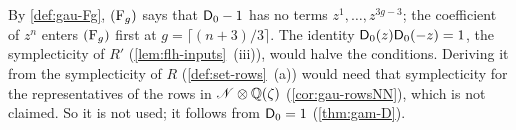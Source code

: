 \begin{rmk}
\label{rmk:con-genus}
By \cref{def:gau-Fg}, $(\mathrm{F}_{g})$ says that $\mathsf{D}_0-1$ has no terms $z^1,\dots,z^{3g-3}$; the coefficient of $z^n$ enters $(\mathrm{F}_{g})$ first at $g=\lceil(n+3)/3\rceil$. The identity $\mathsf{D}_0(z)\mathsf{D}_0(-z)=1$, the symplecticity of $R'$ (\cref{lem:flh-inputs}~(iii)), would halve the conditions. Deriving it from the symplecticity of $R$ (\cref{def:set-rows}~(a)) would need that symplecticity for the representatives of the rows in $\mathscr{N}\otimes\mathbb{Q}(\zeta)$ (\cref{cor:gau-rowsNN}), which is not claimed. So it is not used; it follows from $\mathsf{D}_0=1$ (\cref{thm:gam-D}).
\end{rmk}


